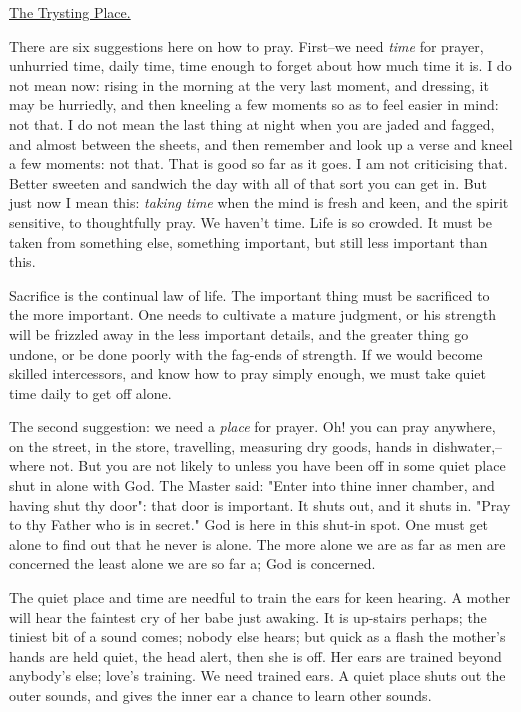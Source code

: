 \underline{The Trysting Place.}


There are six suggestions here on how to pray. First--we need \textit{time} for
prayer, unhurried time, daily time, time enough to forget about how much
time it is. I do not mean now: rising in the morning at the very last
moment, and dressing, it may be hurriedly, and then kneeling a few moments
so as to feel easier in mind: not that. I do not mean the last thing at
night when you are jaded and fagged, and almost between the sheets, and
then remember and look up a verse and kneel a few moments: not that. That
is good so far as it goes. I am not criticising that. Better sweeten and
sandwich the day with all of that sort you can get in. But just now I mean
this: \textit{taking time} when the mind is fresh and keen, and the spirit
sensitive, to thoughtfully pray. We haven't time. Life is so crowded. It
must be taken from something else, something important, but still less
important than this.

Sacrifice is the continual law of life. The important thing must be
sacrificed to the more important. One needs to cultivate a mature
judgment, or his strength will be frizzled away in the less important
details, and the greater thing go undone, or be done poorly with the
fag-ends of strength. If we would become skilled intercessors, and know
how to pray simply enough, we must take quiet time daily to get off alone.

The second suggestion: we need a \textit{place} for prayer. Oh! you can pray
anywhere, on the street, in the store, travelling, measuring dry goods,
hands in dishwater,--where not. But you are not likely to unless you have
been off in some quiet place shut in alone with God. The Master said:
"Enter into thine inner chamber, and having shut thy door": that door is
important. It shuts out, and it shuts in. "Pray to thy Father who is in
secret." God is here in this shut-in spot. One must get alone to find out
that he never is alone. The more alone we are as far as men are concerned
the least alone we are so far a; God is concerned.

The quiet place and time are needful to train the ears for keen hearing. A
mother will hear the faintest cry of her babe just awaking. It is
up-stairs perhaps; the tiniest bit of a sound comes; nobody else hears;
but quick as a flash the mother's hands are held quiet, the head alert,
then she is off. Her ears are trained beyond anybody's else; love's
training. We need trained ears. A quiet place shuts out the outer sounds,
and gives the inner ear a chance to learn other sounds.

